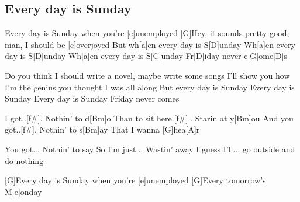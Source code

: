 \subsection*{Every day is Sunday   }
\begin{guitar}
[G]Every day is Sunday when you're [e]unemployed
[G]Hey, it sounds pretty good, man, I should be [e]overjoyed
But wh[a]en every day is S[D]unday
Wh[a]en every day is S[D]unday
Wh[a]en every day is S[C]unday
Fr[D]iday never c[G]ome[D]s


Do you think I should write a novel, maybe write some songs
I'll show you how I'm the genius you thought I was all along
But every day is Sunday
Every day is Sunday
Every day is Sunday
Friday never comes




I got..[f#].
\qquad Nothin' to d[Bm]o
Than to sit here.[f#]..
\qquad Starin at y[Bm]ou
And you got..[f#].
\qquad Nothin' to s[Bm]ay
That I wanna [G]hea[A]r


You got...
\qquad Nothin' to say
So I'm just...
\qquad Wastin' away
I guess I'll...
\qquad  go outside 
and do nothing


[G]Every day is Sunday when you're [e]unemployed
[G]Every tomorrow's M[e]onday  
\end{guitar}

